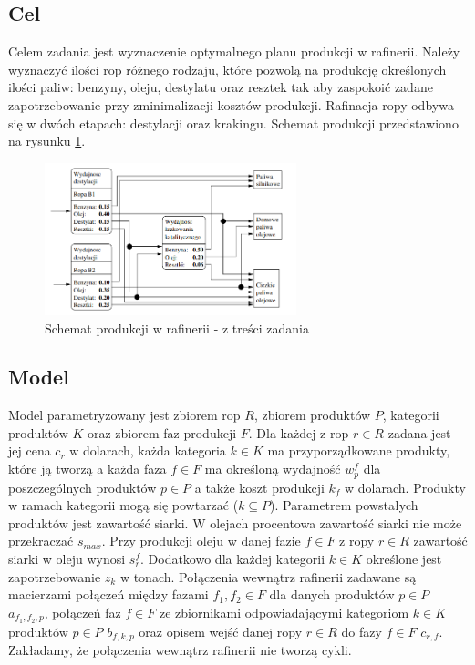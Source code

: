 \documentclass{article}
\begin{document}
\subsection{Cel}
Celem zadania jest wyznaczenie optymalnego planu produkcji w rafinerii.
Należy wyznaczyć ilości rop różnego rodzaju, które pozwolą na produkcję określonych ilości paliw: benzyny, oleju, destylatu oraz resztek tak aby zaspokoić zadane zapotrzebowanie przy zminimalizacji kosztów produkcji.
Rafinacja ropy odbywa się w dwóch etapach: destylacji oraz krakingu. Schemat produkcji przedstawiono na rysunku \ref{fig:rafineria}.
\begin{figure}[h]
    \centering
    \includegraphics[width=0.65\textwidth]{rafineria.png}
    \caption{Schemat produkcji w rafinerii - z treści zadania}
    \label{fig:rafineria}
\end{figure}

\subsection{Model}
Model parametryzowany jest zbiorem rop $R$, zbiorem produktów $P$, kategorii produktów $K$ oraz zbiorem faz produkcji $F$.
Dla każdej z rop $r \in R$ zadana jest jej cena $c_r$ w dolarach, każda kategoria $k \in K$ ma przyporządkowane produkty, które ją tworzą a każda faza $f \in F$ ma określoną wydajność $w_p^f$ dla poszczególnych produktów $p \in P$ a także koszt produkcji $k_f$ w dolarach.
Produkty w ramach kategorii mogą się powtarzać ($k \subseteq P$).
Parametrem powstałych produktów jest zawartość siarki. W olejach procentowa zawartość siarki nie może przekraczać $s_{max}$. Przy produkcji oleju w danej fazie $f \in F$ z ropy $r \in R$ zawartość siarki w oleju wynosi $s_r^f$.
Dodatkowo dla każdej kategorii $k \in K$ określone jest zapotrzebowanie $z_k$ w tonach. 
Połączenia wewnątrz rafinerii zadawane są macierzami połączeń między fazami $f_1, f_2 \in F$ dla danych produktów $p \in P$ $a_{f_1,f_2,p}$, połączeń faz $f \in F$ ze zbiornikami odpowiadającymi kategoriom $k \in K$ produktów $p \in P$ $b_{f,k,p}$ oraz opisem wejść danej ropy $r \in R$ do fazy $f \in F$ $c_{r,f}$.
Zakładamy, że połączenia wewnątrz rafinerii nie tworzą cykli.
\end{document}
